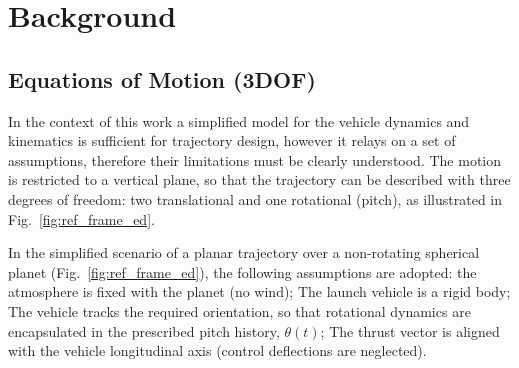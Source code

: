 
\chapter{Background}
\label{chapter:theoretical_background}


\section{Equations of Motion (3DOF)}
\label{sec:EOM}

In the context of this work a simplified model for the vehicle dynamics and kinematics is sufficient for trajectory design, however it relays on a set of assumptions, therefore their limitations must be clearly understood. The motion is restricted to a vertical plane, so that the trajectory can be described with three degrees of freedom: two translational and one rotational (pitch), as illustrated in Fig.~\ref{fig:ref_frame_ed}.

In the simplified scenario of a planar trajectory over a non-rotating spherical planet (Fig.~\ref{fig:ref_frame_ed}), the following assumptions are adopted: the atmosphere is fixed with the planet (no wind); The launch vehicle is a rigid body; The vehicle tracks the required orientation, so that rotational dynamics are encapsulated in the prescribed pitch history, $\theta(t)$; The thrust vector is aligned with the vehicle longitudinal axis (control deflections are neglected).

